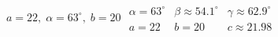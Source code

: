{ $a = 22, \; \alpha = 63^{\circ}, \; b = 20$ \label{ambigthird}}
{ $\begin{array}{lll}\alpha = 63^{\circ} & \beta \approx 54.1^{\circ} & \gamma \approx 62.9^{\circ} \\a = 22 & b = 20 & c \approx 21.98 \end{array}$}
